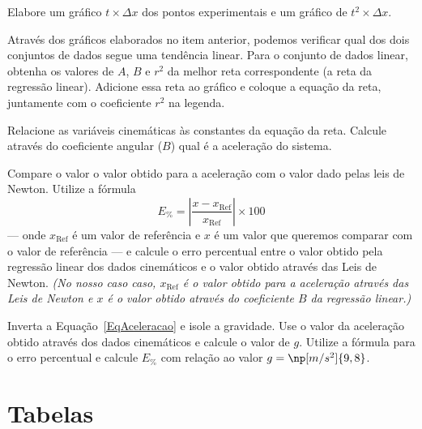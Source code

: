\begin{question}[type={exam}]{2.5}
Elabore um gráfico $ t \times \Delta x$ dos pontos experimentais e um gráfico de $t^2 \times \Delta x$.
\end{question}

\begin{question}[type={exam}]{2}
Através dos gráficos elaborados no item anterior, podemos verificar qual dos dois conjuntos de dados segue uma tendência linear. Para o conjunto de dados linear, obtenha os valores de $A$, $B$ e $r^2$ da melhor reta correspondente (a reta da regressão linear). Adicione essa reta ao gráfico e coloque a equação da reta, juntamente com o coeficiente $r^2$ na legenda.
\end{question}

\begin{question}[type={exam}]{1.5}
Relacione as variáveis cinemáticas às constantes da equação da reta. Calcule através do coeficiente angular ($B$) qual é a aceleração do sistema.
\end{question}

\begin{question}[type={exam}]{1}
Compare o valor o valor obtido para a aceleração com o valor dado pelas leis de Newton. Utilize a fórmula
\begin{equation}
	E_\% = \left|\frac{x - x_{\textrm{Ref}}}{x_{\textrm{Ref}}}\right| \times 100
\end{equation}
%
--- onde $x_{\textrm{Ref}}$ é um valor de referência e $x$ é um valor que queremos comparar com o valor de referência --- e calcule o erro percentual entre o valor obtido pela regressão linear dos dados cinemáticos e o valor obtido através das Leis de Newton. \emph{(No nosso caso caso, $x_{\textrm{Ref}}$ é o valor obtido para a aceleração através das Leis de Newton e $x$ é o valor obtido através do coeficiente $B$ da regressão linear.)}
\end{question}

\begin{question}[type={exam}]{1}
Inverta a Equação~\eqref{EqAceleracao} e isole a gravidade. Use o valor da aceleração obtido através dos dados cinemáticos e calcule o valor de $g$. Utilize a fórmula para o erro percentual e calcule $E_\%$ com relação ao valor $g=\np[m/s^2]{9,8}$.
\end{question}

\vfill
\pagebreak
\section{Tabelas}

